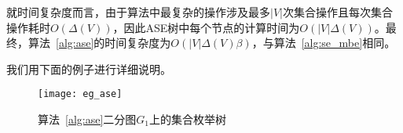 就时间复杂度而言，由于算法中最复杂的操作涉及最多$|V|$次集合操作且每次集合操作耗时$O(\Delta(V))$，因此ASE树中每个节点的计算时间为$O(|V|\Delta(V))$。最终，算法~\ref{alg:ase}的时间复杂度为$O(|V|\Delta(V)\beta)$，与算法~\ref{alg:se_mbe}相同。

我们用下面的例子进行详细说明。

\begin{figure} [ht]
  \vspace{0.1 in}
  \centering
  \texttt{[image: eg\_ase]}
  \caption{算法~\ref{alg:ase}二分图$G_1$上的集合枚举树}
  \label{fig:ase}
\end{figure}

\begin{example}
  \label{example:ase}

  


\end{example}
